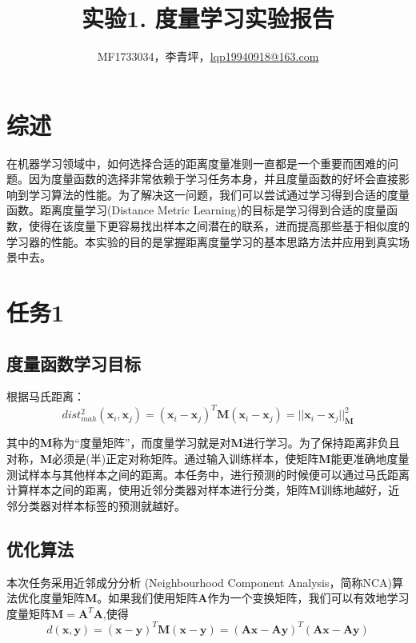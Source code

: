 \documentclass[a4paper,UTF8]{article}
\theoremstyle{definition}
\begin{document}
\title{实验1. 度量学习实验报告}
\author{MF1733034，李青坪，\url{lqp19940918@163.com}}
\maketitle

\section*{综述}
	在机器学习领域中，如何选择合适的距离度量准则一直都是一个重要而困难的问题。因为度量函数的选择非常依赖于学习任务本身，并且度量函数的好坏会直接影响到学习算法的性能。为了解决这一问题，我们可以尝试通过学习得到合适的度量函数。距离度量学习(Distance Metric Learning)的目标是学习得到合适的度量函数，使得在该度量下更容易找出样本之间潜在的联系，进而提高那些基于相似度的学习器的性能。本实验的目的是掌握距离度量学习的基本思路方法并应用到真实场景中去。

\section*{任务1}
	\subsection*{度量函数学习目标}
		根据马氏距离：
		$$dist_{mah}^2(\textbf{x}_i,\textbf{x}_j) = (\textbf{x}_i-\textbf{x}_j)^T \textbf{M} (\textbf{x}_i-\textbf{x}_j) = ||\textbf{x}_i-\textbf{x}_j||_\textbf{M}^2 $$
		
		其中的\textbf{M}称为“度量矩阵”，而度量学习就是对\textbf{M}进行学习。为了保持距离非负且对称，\textbf{M}必须是(半)正定对称矩阵。通过输入训练样本，使矩阵\textbf{M}能更准确地度量测试样本与其他样本之间的距离。本任务中，进行预测的时候便可以通过马氏距离计算样本之间的距离，使用近邻分类器对样本进行分类，矩阵\textbf{M}训练地越好，近邻分类器对样本标签的预测就越好。
	\subsection*{优化算法}
		本次任务采用近邻成分分析\cite{Roweis2004Neighbourhood} (Neighbourhood Component Analysis，简称NCA)算法优化度量矩阵\textbf{M}。如果我们使用矩阵\textbf{A}作为一个变换矩阵，我们可以有效地学习度量矩阵$\textbf{M}=\textbf{A}^T\textbf{A}$,使得
		$$d(\textbf{x},\textbf{y})=(\textbf{x}-\textbf{y})^T \textbf{M} (\textbf{x}-\textbf{y})=(\textbf{Ax}-\textbf{Ay})^T(\textbf{Ax}-\textbf{Ay})$$
		
\end{document}

